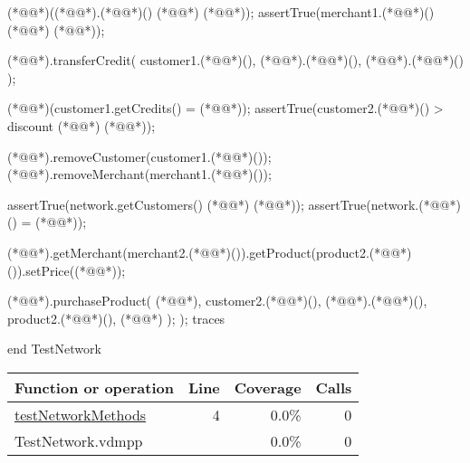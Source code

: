 \begin{vdmpp}[breaklines=true]
   (*@@*)((*@@*).(*@@*)() (*@\vdmnotcovered{>}@*) (*@@*));
   assertTrue(merchant1.(*@@*)() (*@\vdmnotcovered{>}@*) (*@@*));   
   
   (*@@*).transferCredit(
    customer1.(*@@*)(),
    (*@@*).(*@@*)(),
    (*@@*).(*@@*)()
   );
   
   (*@@*)(customer1.getCredits() = (*@@*));
   assertTrue(customer2.(*@@*)() > discount (*@\vdmnotcovered{*}@*) (*@@*));
   
   (*@@*).removeCustomer(customer1.(*@@*)());
   (*@@*).removeMerchant(merchant1.(*@@*)());
   
   assertTrue(network.getCustomers() (*@\vdmnotcovered{=}@*) {(*@@*)});   
   assertTrue(network.(*@@*)() = {(*@@*)});
   
   (*@@*).getMerchant(merchant2.(*@@*)()).getProduct(product2.(*@@*)()).setPrice((*@@*));
   
   (*@@*).purchaseProduct(
    (*@@*),
    customer2.(*@@*)(),
    (*@@*).(*@@*)(),
    product2.(*@@*)(),
    (*@@*)
   );
  );
 traces

end TestNetwork
\end{vdmpp}
\bigskip
\begin{longtable}{|l|r|r|r|}
\hline
Function or operation & Line & Coverage & Calls \\
\hline
\hline
\hyperref[testNetworkMethods:4]{testNetworkMethods} & 4&0.0\% & 0 \\
\hline
\hline
TestNetwork.vdmpp & & 0.0\% & 0 \\
\hline
\end{longtable}

